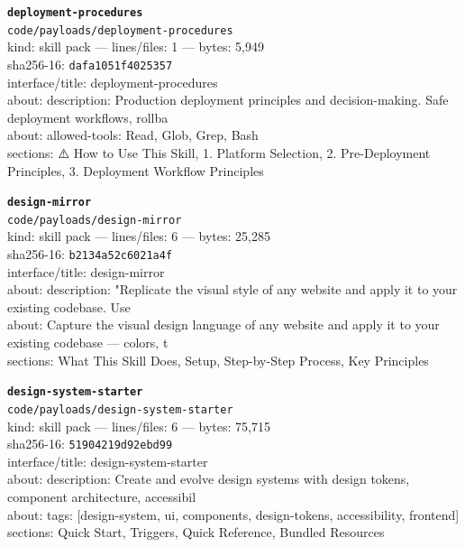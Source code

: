 \noindent\textbf{\texttt{deployment-procedures}}\\
\texttt{code/payloads/deployment-procedures}\\
kind: skill pack --- lines/files: 1 --- bytes: 5,949\\
sha256-16: \texttt{dafa1051f4025357}\\
interface/title: deployment-procedures\\
about: description: Production deployment principles and decision-making. Safe deployment workflows, rollba\\
about: allowed-tools: Read, Glob, Grep, Bash\\
sections: ⚠️ How to Use This Skill, 1. Platform Selection, 2. Pre-Deployment Principles, 3. Deployment Workflow Principles\\
\vspace*{6.0pt}

\noindent\textbf{\texttt{design-mirror}}\\
\texttt{code/payloads/design-mirror}\\
kind: skill pack --- lines/files: 6 --- bytes: 25,285\\
sha256-16: \texttt{b2134a52c6021a4f}\\
interface/title: design-mirror\\
about: description: "Replicate the visual style of any website and apply it to your existing codebase. Use \\
about: Capture the visual design language of any website and apply it to your existing codebase — colors, t\\
sections: What This Skill Does, Setup, Step-by-Step Process, Key Principles\\
\vspace*{6.0pt}

\noindent\textbf{\texttt{design-system-starter}}\\
\texttt{code/payloads/design-system-starter}\\
kind: skill pack --- lines/files: 6 --- bytes: 75,715\\
sha256-16: \texttt{51904219d92ebd99}\\
interface/title: design-system-starter\\
about: description: Create and evolve design systems with design tokens, component architecture, accessibil\\
about: tags: [design-system, ui, components, design-tokens, accessibility, frontend]\\
sections: Quick Start, Triggers, Quick Reference, Bundled Resources\\
\vspace*{6.0pt}
\newpage

